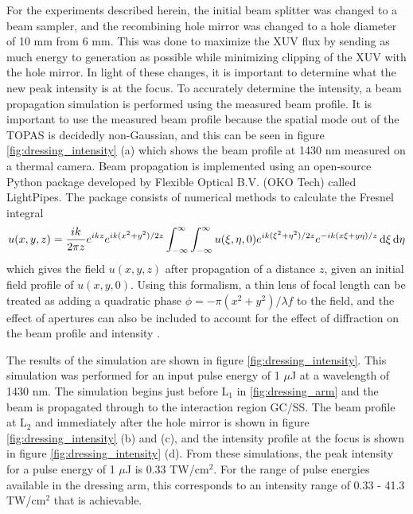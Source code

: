 For the experiments described herein, the initial beam splitter was changed to a beam sampler, and the recombining hole mirror was changed to a hole diameter of 10 mm from 6 mm.  This was done to maximize the XUV flux by sending as much energy to generation as possible while minimizing clipping of the XUV with the hole mirror.  In light of these changes, it is important to determine what the new peak intensity is at the focus.  To accurately determine the intensity, a beam propagation simulation is performed using the measured beam profile.  It is important to use the measured beam profile because the spatial mode out of the TOPAS is decidedly non-Gaussian, and this can be seen in figure \ref{fig:dressing_intensity} (a) which shows the beam profile at 1430 nm measured on a thermal camera.  Beam propagation is implemented using an open-source Python package developed by Flexible Optical B.V. (OKO Tech) called LightPipes.  The package consists of numerical methods to calculate the Fresnel integral
\begin{equation}
\label{fresnel_integral_0}
u(x,y,z)=\frac{i k}{2\pi z}e^{i k z}e^{i k (x^2+y^2)/2z}\int_{-\infty}^{\infty}\int_{-\infty}^{\infty}u(\xi,\eta,0) e^{ik(\xi^{2}+\eta^{2})/2z} e^{-ik(x\xi + y\eta)/z} \mathop{}\!\mathrm{d}\xi\mathop{}\!\mathrm{d}\eta
\end{equation}
which gives the field $u(x,y,z)$ after propagation of a distance $z$, given an initial field profile of $u(x,y,0)$.  Using this formalism, a thin lens of focal length can be treated as adding a quadratic phase $\phi=-\pi(x^2+y^2)/\lambda f$ to the field, and the effect of apertures can also be included to account for the effect of diffraction on the beam profile and intensity \cite{goodmanIntroductionFourierOptics2005}.

The results of the simulation are shown in figure \ref{fig:dressing_intensity}.  This simulation was performed for an input pulse energy of 1 $\mu$J at a wavelength of 1430 nm. The simulation begins just before L$_1$ in \ref{fig:dressing_arm} and the beam is propagated through to the interaction region GC/SS.  The beam profile at L$_2$ and immediately after the hole mirror is shown in figure \ref{fig:dressing_intensity} (b) and (c), and the intensity profile at the focus is shown in figure \ref{fig:dressing_intensity} (d).  From these simulations, the peak intensity for a pulse energy of 1 $\mu$J is 0.33 TW/cm$^2$. For the range of pulse energies available in the dressing arm, this corresponds to an intensity range of 0.33 - 41.3 TW/cm$^2$ that is achievable.

